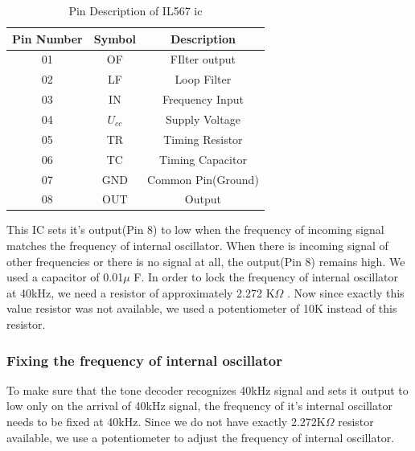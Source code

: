 \begin{table}[h!]
	\centering
	\caption{Pin Description of IL567 \gls{ic}\cite{ToneDecoder}}
	\begin{tabular}{|c|c|c|}
		\hline 
		\bf{Pin Number} & \bf{Symbol} & \bf{Description} \\ 
		\hline 
		01 & OF & FIlter output \\	
		02 & LF & Loop Filter \\
		03 & IN & Frequency Input \\	  
		04 & $U_{cc}$ & Supply Voltage \\	  
		05 & TR & Timing Resistor \\	  
		06 & TC & Timing Capacitor \\	  
		07 & GND & Common Pin(Ground) \\	  
		08 & OUT & Output \\ 
		\hline 
	\end{tabular} 
\end{table}

This IC sets it's output(Pin 8) to low when the frequency of incoming signal matches the frequency of internal oscillator. When there is incoming signal of other frequencies or there is no signal at all, the output(Pin 8) remains high. 
We used a capacitor of 0.01$\mu$ F. In order to lock the frequency of internal oscillator at 40kHz, we need a resistor of approximately 2.272 K$\Omega$ . Now since exactly this value resistor was not available, we used a potentiometer of 10K instead of this resistor. 

\subsubsection{Fixing the frequency of internal oscillator}

To make sure that the tone decoder recognizes 40kHz signal and sets it output to low only on the arrival of 40kHz signal, the frequency of it's internal oscillator needs to be fixed at 40kHz. Since we do not have exactly 2.272K$\Omega$ resistor available, we use a potentiometer to adjust the frequency of internal oscillator.

